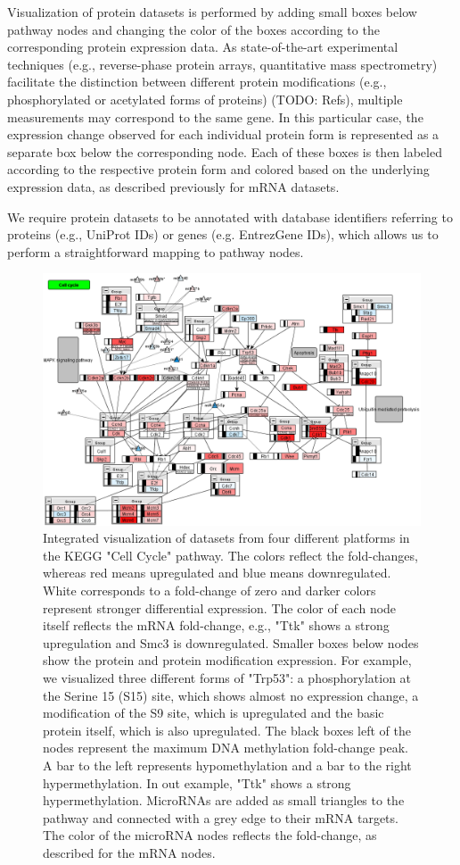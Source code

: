 \documentclass{bioinfo}
\begin{document}
Visualization of protein datasets is performed by adding small boxes below pathway nodes and
changing the color of the boxes according to the corresponding protein expression data. As state-of-the-art
experimental techniques (e.g., reverse-phase protein arrays, quantitative mass spectrometry)
facilitate the distinction between different protein modifications (e.g., phosphorylated or
acetylated forms of proteins) (TODO: Refs), multiple measurements may correspond to the same gene.
In this particular case, the expression change observed for each individual protein form is represented
as a separate box below the corresponding node. Each of these boxes is then labeled according to the
respective protein form and colored based on the underlying expression data, as described previously
for mRNA datasets.

We require protein datasets to be annotated with database identifiers referring to proteins (e.g.,
UniProt IDs) or genes (e.g. EntrezGene IDs), which allows us to perform a straightforward mapping to
pathway nodes.


\begin{figure}
\centering
\includegraphics[width=.70\textwidth]{figures/mmu04110.png}
\caption{Integrated visualization of datasets from four different platforms in the KEGG "Cell Cycle" pathway.
The colors reflect the fold-changes, whereas red means upregulated and blue means
downregulated. White corresponds to a fold-change of zero and darker colors represent stronger
differential expression. The color of each node itself reflects the mRNA fold-change, e.g., "Ttk"
shows a strong upregulation and Smc3 is downregulated. Smaller boxes below nodes show the protein
and protein modification expression. For example, we visualized three different forms of "Trp53": a
phosphorylation at the Serine 15 (S15) site, which shows almost no expression change, a modification
of the S9 site, which is upregulated and the basic protein itself, which is also upregulated.  The
black boxes left of the nodes represent the maximum DNA methylation fold-change peak. A bar to the
left represents hypomethylation and a bar to the right hypermethylation. In out example, "Ttk" shows
a strong hypermethylation. MicroRNAs are added as small triangles to the pathway and connected with
a grey edge to their mRNA targets. The color of the microRNA nodes reflects the fold-change, as
described for the mRNA nodes.}
\label{fig:cellcycle}
\end{figure}
\end{document}
